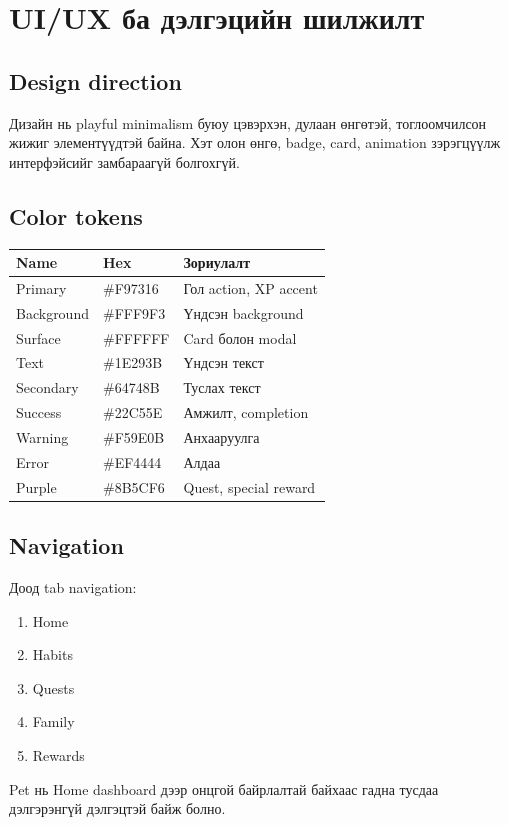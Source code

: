 \documentclass[12pt,a4paper,oneside]{report}
\begin{document}
\chapter{UI/UX ба дэлгэцийн шилжилт}

\section{Design direction}
Дизайн нь playful minimalism буюу цэвэрхэн, дулаан өнгөтэй, тоглоомчилсон жижиг элементүүдтэй байна. Хэт олон өнгө, badge, card, animation зэрэгцүүлж интерфэйсийг замбараагүй болгохгүй.

\section{Color tokens}
\begin{longtable}{p{}p{}p{}}
\toprule
\textbf{Name} & \textbf{Hex} & \textbf{Зориулалт}\\
\midrule
Primary & \#F97316 & Гол action, XP accent\\
Background & \#FFF9F3 & Үндсэн background\\
Surface & \#FFFFFF & Card болон modal\\
Text & \#1E293B & Үндсэн текст\\
Secondary & \#64748B & Туслах текст\\
Success & \#22C55E & Амжилт, completion\\
Warning & \#F59E0B & Анхааруулга\\
Error & \#EF4444 & Алдаа\\
Purple & \#8B5CF6 & Quest, special reward\\
\bottomrule
\end{longtable}

\section{Navigation}
Доод tab navigation:
\begin{enumerate}
  \item Home
  \item Habits
  \item Quests
  \item Family
  \item Rewards
\end{enumerate}
Pet нь Home dashboard дээр онцгой байрлалтай байхаас гадна тусдаа дэлгэрэнгүй дэлгэцтэй байж болно.
\end{document}
